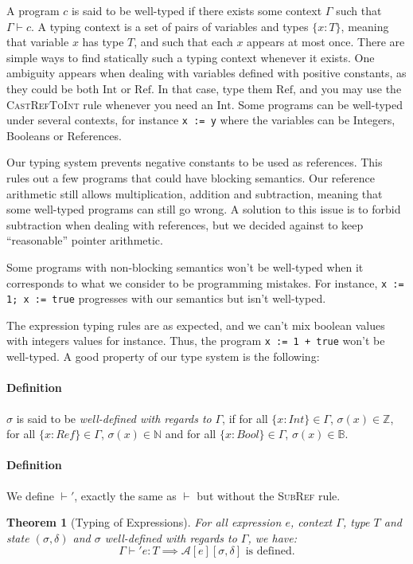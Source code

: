 \documentclass{article}
\newtheorem{thm}{Theorem}
\newcommand{\Aa}[2]{\mathcal{A}\left[#1\right]\left[#2\right]}
\newcommand{\Ref}{\mathrm{Ref}}
\newcommand{\Int}{\mathrm{Int}}
\begin{document}
A program $c$ is said to be well-typed if there exists some context $\Gamma$ such that $\Gamma\vdash c$.
A typing context is a set of pairs of variables and types $\{x:T\}$, meaning that variable $x$ has type $T$, and such that each $x$ appears at most once.
There are simple ways to find statically such a typing context whenever it exists. One ambiguity appears when dealing with variables defined with positive constants, as they could be both $\Int$ or $\Ref$. In that case, type them $\Ref$, and you may use the \textsc{CastRefToInt} rule whenever you need an $\Int$.
Some programs can be well-typed under several contexts, for instance \texttt{x := y} where the variables can be Integers, Booleans or References.

Our typing system prevents negative constants to be used as references.
This rules out a few programs that could have blocking semantics.
Our reference arithmetic still allows multiplication, addition and subtraction, meaning that some well-typed programs can still go wrong.
A solution to this issue is to forbid subtraction when dealing with references, but we decided against to keep ``reasonable'' pointer arithmetic.

Some programs with non-blocking semantics won't be well-typed when it corresponds to what we consider to be programming mistakes. For instance, \texttt{x := 1; x := true} progresses with our semantics but isn't well-typed.

The expression typing rules are as expected, and we can't mix boolean values with integers values for instance. Thus, the program \texttt{x := 1 + true} won't be well-typed. A good property of our type system is the following:\\

\paragraph{Definition} $\sigma$ is said to be \textit{well-defined with regards to} $\Gamma$, if for all $\{x:Int\}\in\Gamma$, $\sigma(x)\in\mathbb{Z}$, for all $\{x:Ref\}\in\Gamma$, $\sigma(x)\in\mathbb{N}$ and for all $\{x:Bool\}\in\Gamma$, $\sigma(x)\in\mathbb{B}$.

\paragraph{Definition} We define $\vdash'$, exactly the same as $\vdash$ but without the \textsc{SubRef} rule.

\begin{thm}[Typing of Expressions]
For all expression $e$, context $\Gamma$, type $T$ and state $(\sigma, \delta)$ and $\sigma$ well-defined with regards to $\Gamma$, we have:
\[
\Gamma\vdash' e : T\implies \Aa{e}{\sigma,\delta}\text{ is defined}.
\]
\end{thm}
\end{document}
